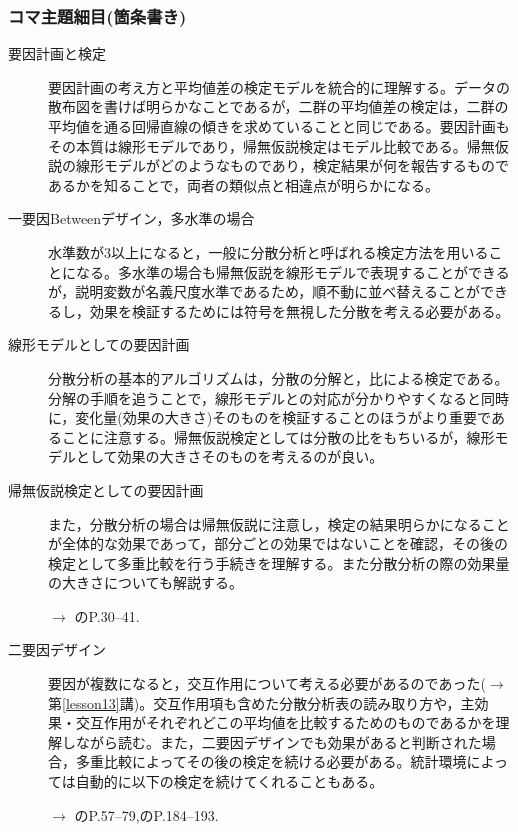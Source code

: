 \subsubsection{コマ主題細目(箇条書き)}
\begin{description}

\item[要因計画と検定]要因計画の考え方と平均値差の検定モデルを統合的に理解する。データの散布図を書けば明らかなことであるが，二群の平均値差の検定は，二群の平均値を通る回帰直線の傾きを求めていることと同じである。要因計画もその本質は線形モデルであり，帰無仮説検定はモデル比較である。帰無仮説の線形モデルがどのようなものであり，検定結果が何を報告するものであるかを知ることで，両者の類似点と相違点が明らかになる。

\item[一要因Betweenデザイン，多水準の場合]水準数が3以上になると，一般に分散分析と呼ばれる検定方法を用いることになる。多水準の場合も帰無仮説を線形モデルで表現することができるが，説明変数が名義尺度水準であるため，順不動に並べ替えることができるし，効果を検証するためには符号を無視した分散を考える必要がある。
\item[線形モデルとしての要因計画]分散分析の基本的アルゴリズムは，分散の分解と，比による検定である。分解の手順を追うことで，線形モデルとの対応が分かりやすくなると同時に，変化量(効果の大きさ)そのものを検証することのほうがより重要であることに注意する。帰無仮説検定としては分散の比をもちいるが，線形モデルとして効果の大きさそのものを考えるのが良い。 

\item[帰無仮説検定としての要因計画]また，分散分析の場合は帰無仮説に注意し，検定の結果明らかになることが全体的な効果であって，部分ごとの効果ではないことを確認，その後の検定として多重比較を行う手続きを理解する。また分散分析の際の効果量の大きさについても解説する。
\begin{flushright}
    $\to$ \citet{橋本201607} のP.30--41.
\end{flushright}

\item[二要因デザイン]要因が複数になると，交互作用について考える必要があるのであった($\to$第\ref{lesson13}講)。交互作用項も含めた分散分析表の読み取り方や，主効果・交互作用がそれぞれどこの平均値を比較するためのものであるかを理解しながら読む。また，二要因デザインでも効果があると判断された場合，多重比較によってその後の検定を続ける必要がある。統計環境によっては自動的に以下の検定を続けてくれることもある。
\begin{flushright}
    $\to$ \citet{橋本201607} のP.57--79,\citet{Yamada2004}のP.184--193.
\end{flushright}

\end{description}
